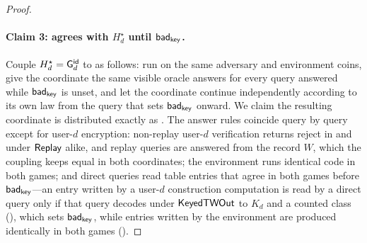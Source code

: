\begin{proof}
\paragraph{Claim 3: \Grej{} agrees with $H_d^\star$ until $\mathsf{bad}_{\mathsf{key}}$.}
Couple $H_d^\star = \mathsf{G}^{\mathsf{id}}_{d}{}$ to \Grej{} as follows: run \Grej{} on
the same adversary and environment coins, give the \Gideal{} coordinate
the same visible oracle answers for every query answered while
$\mathsf{bad}_{\mathsf{key}}$ is unset, and let the \Gideal{} coordinate continue
independently according to its own law from the query that sets
$\mathsf{bad}_{\mathsf{key}}$ onward. We claim the resulting \Gideal{} coordinate is distributed
exactly as \Gideal{}. The answer rules coincide query by query except
for user-$d$ encryption: non-replay user-$d$ verification returns
reject in \Grej{} and under $\mathsf{Replay}$ alike, and replay queries are
answered from the record $W$, which the coupling keeps equal in both
coordinates; the environment runs identical code in both games; and
direct queries read table entries that agree in both games before
$\mathsf{bad}_{\mathsf{key}}$---an entry written by a user-$d$ construction computation is
read by a direct query only if that query decodes under $\mathsf{KeyedTWOut}$
to $K_d$ and a counted class (), which sets
$\mathsf{bad}_{\mathsf{key}}$, while entries written by the environment are produced
identically in both games ().


\end{proof}

